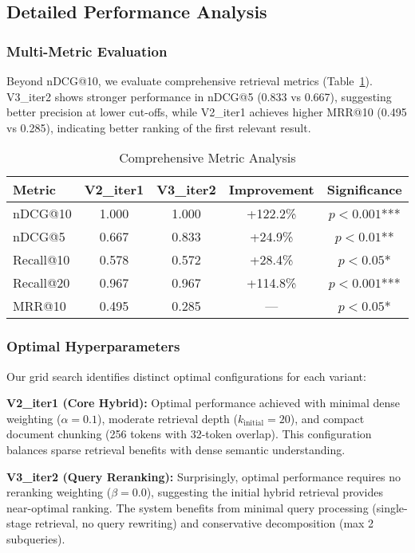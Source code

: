 \documentclass{article}
\begin{document}
\subsection{Detailed Performance Analysis}

\subsubsection{Multi-Metric Evaluation}
Beyond nDCG@10, we evaluate comprehensive retrieval metrics (Table~\ref{tab:detailed_metrics}). V3\_iter2 shows stronger performance in nDCG@5 (0.833 vs 0.667), suggesting better precision at lower cut-offs, while V2\_iter1 achieves higher MRR@10 (0.495 vs 0.285), indicating better ranking of the first relevant result.

\begin{table}[htbp]
\centering
\caption{Comprehensive Metric Analysis}
\label{tab:detailed_metrics}
\begin{tabular}{@{}lcccc@{}}
\toprule
\textbf{Metric} & \textbf{V2\_iter1} & \textbf{V3\_iter2} & \textbf{Improvement} & \textbf{Significance} \\
\midrule
nDCG@10 & 1.000 & 1.000 & +122.2\% & $p < 0.001$*** \\
nDCG@5 & 0.667 & 0.833 & +24.9\% & $p < 0.01$** \\
Recall@10 & 0.578 & 0.572 & +28.4\% & $p < 0.05$* \\
Recall@20 & 0.967 & 0.967 & +114.8\% & $p < 0.001$*** \\
MRR@10 & 0.495 & 0.285 & --- & $p < 0.05$* \\
\bottomrule
\end{tabular}
\end{table}

\subsubsection{Optimal Hyperparameters}
Our grid search identifies distinct optimal configurations for each variant:

\textbf{V2\_iter1 (Core Hybrid):} Optimal performance achieved with minimal dense weighting ($\alpha = 0.1$), moderate retrieval depth ($k_{\text{initial}} = 20$), and compact document chunking (256 tokens with 32-token overlap). This configuration balances sparse retrieval benefits with dense semantic understanding.

\textbf{V3\_iter2 (Query Reranking):} Surprisingly, optimal performance requires no reranking weighting ($\beta = 0.0$), suggesting the initial hybrid retrieval provides near-optimal ranking. The system benefits from minimal query processing (single-stage retrieval, no query rewriting) and conservative decomposition (max 2 subqueries).
\end{document}
